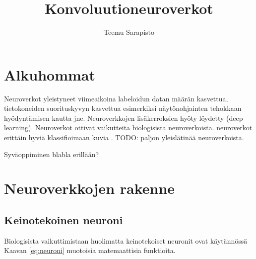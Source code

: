 \documentclass[11pt]{article}
\theoremstyle{plain}
\theoremstyle{definition}
\begin{document}
  \title{Konvoluutioneuroverkot}
  \author{Teemu Sarapisto}
  \maketitle

  \section{Alkuhommat}




  Neuroverkot yleistyneet viimeaikoina labeloidun datan määrän kasvettua, tietokoneiden suorituskyvyn kasvettua esimerkiksi näytönohjainten tehokkaan hyödyntämisen kautta jne. Neuroverkkojen lisäkerroksien hyöty löydetty (deep learning). Neuroverkot ottivat vaikutteita biologisista neuroverkoista. neuroverkot erittäin hyviä klassifioimaan kuvia \cite{Goodfellow-et-al-2016}. TODO: paljon yleislätinää neuroverkoista.

  Syväoppiminen blabla erillään?


  \section{Neuroverkkojen rakenne}
  \subsection{Keinotekoinen neuroni}


    Biologisista vaikuttimistaan huolimatta keinotekoiset neuronit ovat käytännössä Kaavan \ref{eq:neuroni} muotoisia matemaattisia funktioita.
\end{document}
